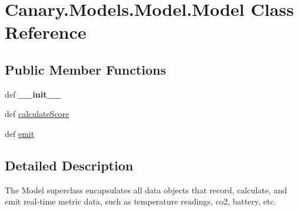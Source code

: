 \hypertarget{class_canary_8_models_1_1_model_1_1_model}{\section{Canary.\-Models.\-Model.\-Model Class Reference}
\label{class_canary_8_models_1_1_model_1_1_model}
}
\subsection*{Public Member Functions}
\begin{DoxyCompactItemize}
\item 
\hypertarget{class_canary_8_models_1_1_model_1_1_model_a76905444ab8cbb51e286c1556ec245ec}{def {\bfseries \-\_\-\-\_\-init\-\_\-\-\_\-}}\label{class_canary_8_models_1_1_model_1_1_model_a76905444ab8cbb51e286c1556ec245ec}

\item 
def \hyperlink{class_canary_8_models_1_1_model_1_1_model_a65f518e8b55837f5a31f0194921ff89e}{calculate\-Score}
\item 
def \hyperlink{class_canary_8_models_1_1_model_1_1_model_a503d813d9552f7f0d1cb03ad569dd827}{emit}
\end{DoxyCompactItemize}


\subsection{Detailed Description}
\begin{DoxyVerb}The Model superclass encapsulates all data objects that record, calculate, and emit real-time metric data, such as temperature readings, co2, battery, etc.\end{DoxyVerb}
 


